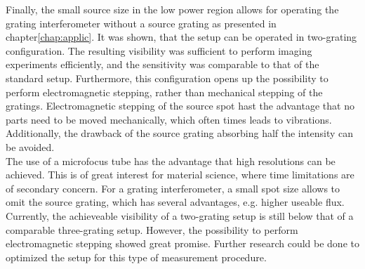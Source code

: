 Finally, the small source size in the low power region allows for operating the grating interferometer without a source grating as presented in chapter\ref{chap:applic}. It was shown, that the setup can be operated in two-grating configuration. The resulting visibility was sufficient to perform imaging experiments efficiently, and the sensitivity was comparable to that of the standard setup.
Furthermore, this configuration opens up the possibility to perform electromagnetic stepping, rather than mechanical stepping of the gratings. Electromagnetic stepping of the source spot hast the advantage that no parts need to be moved mechanically, which often times leads to vibrations. Additionally, the drawback of the source grating absorbing half the intensity can be avoided.\\ 


The use of a microfocus tube has the advantage that high resolutions can be achieved. This is of great interest for material science, where time limitations are of secondary concern. For a grating interferometer, a small spot size allows to omit the source grating, which has several advantages, e.g. higher useable flux. Currently, the achieveable visibility of a two-grating setup is still below that of a comparable three-grating setup. However, the possibility to perform electromagnetic stepping showed great promise. Further research could be done to optimized the setup for this type of measurement procedure.
 












